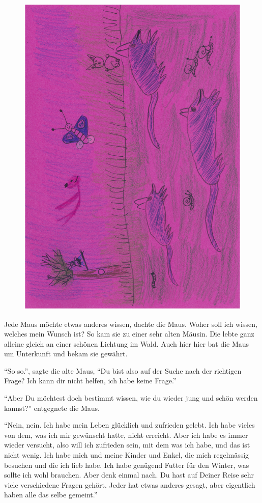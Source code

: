 \begin{figure}[h]
\centering
\includegraphics[angle=270,width=\textwidth]{bilder/maus_1.pdf}
\end{figure}

Jede Maus möchte etwas anderes wissen, dachte die Maus. Woher soll ich wissen, welches mein Wunsch ist? So kam sie zu einer sehr alten Mäusin. Die lebte ganz alleine gleich an einer schönen Lichtung im Wald. Auch hier hier bat die Maus um Unterkunft und bekam sie gewährt. 

\enquote{So so.}, sagte die alte Maus, \enquote{Du bist also auf der Suche nach der richtigen Frage? Ich kann dir nicht helfen, ich habe keine Frage.} 

\enquote{Aber Du möchtest doch bestimmt wissen, wie du wieder jung und schön werden kannst?} entgegnete die Maus.

\enquote{Nein, nein. Ich habe mein Leben glücklich und zufrieden gelebt. Ich habe vieles von dem, was ich mir gewünscht hatte, nicht erreicht. Aber ich habe es immer wieder versucht, also will ich zufrieden sein, mit dem was ich habe, und das ist nicht wenig. Ich habe mich und meine Kinder und Enkel, die mich regelmässig besuchen und die ich lieb habe. Ich habe genügend Futter für den Winter, was sollte ich wohl brauchen. Aber denk einmal nach. Du hast auf Deiner Reise sehr viele verschiedene Fragen gehört. Jeder hat etwas anderes gesagt, aber eigentlich haben alle das selbe gemeint.}

